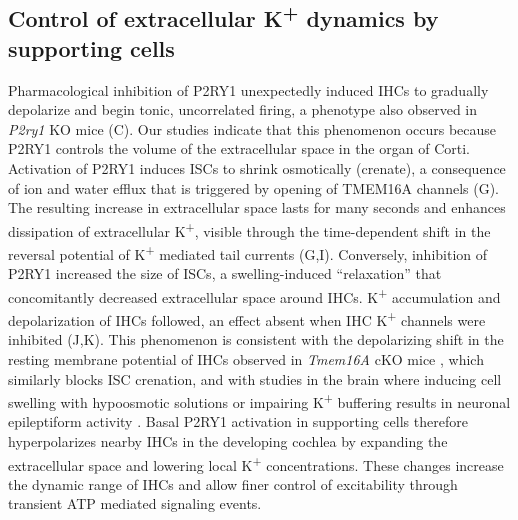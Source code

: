 \documentclass[9pt,lineno]{elife}
\begin{document}
\subsection{Control of extracellular K\textsuperscript{+} dynamics by supporting cells}
Pharmacological inhibition of P2RY1 unexpectedly induced IHCs to gradually depolarize and begin tonic, uncorrelated firing, a phenotype also observed in \textit{P2ry1} KO mice (C). Our studies indicate that this phenomenon occurs because P2RY1 controls the volume of the extracellular space in the organ of Corti. Activation of P2RY1 induces ISCs to shrink osmotically (crenate), a consequence of ion and water efflux that is triggered by opening of TMEM16A channels (G). The resulting increase in extracellular space lasts for many seconds and enhances dissipation of extracellular K\textsuperscript{+}, visible through the time-dependent shift in the reversal potential of K\textsuperscript{+} mediated tail currents (G,I). Conversely, inhibition of P2RY1 increased the size of ISCs, a swelling-induced ``relaxation'' that concomitantly decreased extracellular space around IHCs. K\textsuperscript{+} accumulation and depolarization of IHCs followed, an effect absent when IHC K\textsuperscript{+} channels were inhibited (J,K). This phenomenon is consistent with the depolarizing shift in the resting membrane potential of IHCs observed in \textit{Tmem16A} cKO mice \citep{Wang2015}, which similarly blocks ISC crenation, and with studies in the brain where inducing cell swelling with hypoosmotic solutions or impairing K\textsuperscript{+} buffering results in neuronal epileptiform activity \citep{Larson2018,Murphy2017,Thrane2013}. Basal P2RY1 activation in supporting cells therefore hyperpolarizes nearby IHCs in the developing cochlea by expanding the extracellular space and lowering local K\textsuperscript{+} concentrations. These changes increase the dynamic range of IHCs and allow finer control of excitability through transient ATP mediated signaling events. 
\end{document}
